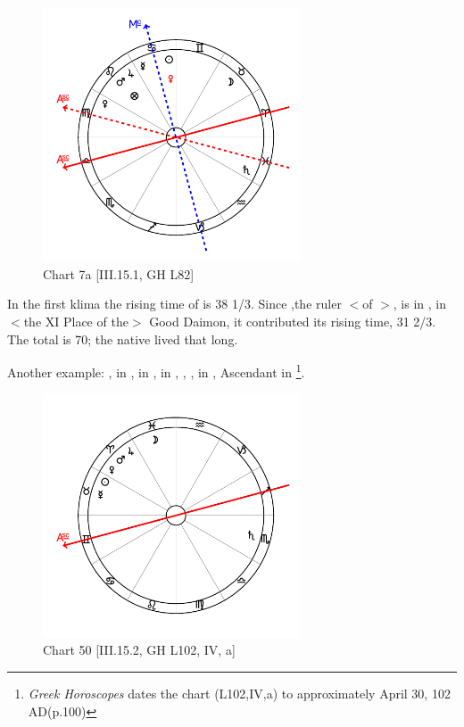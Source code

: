 \clearpage
\begin{figure}
\centering
\vspace{-20pt}
\includegraphics[width=0.68\textwidth]{charts/3_15_1}
\caption{Chart 7a [III.15.1, GH L82]}
\label{fig:chart7a}
\end{figure} 

In the first klima the rising time of \Virgo\xspace is 38 1/3. Since \Mercury,the ruler $<$of \Virgo$>$, is in \Cancer, in $<$the XI Place of the$>$ Good Daimon, it contributed its rising time, 31 2/3. The total is 70; the native lived that long.

\newpage
Another example: \Sun, \Mercury\xspace in \Taurus, \Moon\xspace in \Pisces, \Saturn\xspace in \Scorpio, \Jupiter, \Mars, \Venus in \Aries, Ascendant in \Gemini
\footnote{\textit{Greek Horoscopes} dates the chart (L102,IV,a) to approximately April 30, 102 AD(p.100)}.

\clearpage
\begin{figure}
\centering
\vspace{-20pt}
\includegraphics[width=0.68\textwidth]{charts/3_15_2}
\caption{Chart 50 [III.15.2, GH L102, IV, a]}
\label{fig:chart50}
\end{figure} 

